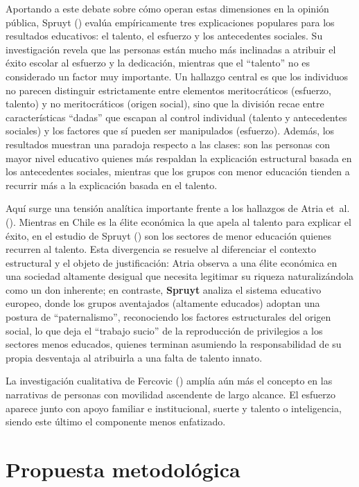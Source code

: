 \documentclass[
  spanish,
  a4paper,
  oneside]{scrbook}
\begin{document}
Aportando a este debate sobre cómo operan estas dimensiones en la
opinión pública, Spruyt ()
evalúa empíricamente tres explicaciones populares para los resultados
educativos: el talento, el esfuerzo y los antecedentes sociales. Su
investigación revela que las personas están mucho más inclinadas a
atribuir el éxito escolar al esfuerzo y la dedicación, mientras que el
``talento'' no es considerado un factor muy importante. Un hallazgo
central es que los individuos no parecen distinguir estrictamente entre
elementos meritocráticos (esfuerzo, talento) y no meritocráticos (origen
social), sino que la división recae entre características ``dadas'' que
escapan al control individual (talento y antecedentes sociales) y los
factores que sí pueden ser manipulados (esfuerzo). Además, los
resultados muestran una paradoja respecto a las clases: son las personas
con mayor nivel educativo quienes más respaldan la explicación
estructural basada en los antecedentes sociales, mientras que los grupos
con menor educación tienden a recurrir más a la explicación basada en el
talento.

Aquí surge una tensión analítica importante frente a los hallazgos de
Atria et~al. (). Mientras en
Chile es la élite económica la que apela al talento para explicar el
éxito, en el estudio de Spruyt
() son los sectores de menor
educación quienes recurren al talento. Esta divergencia se resuelve al
diferenciar el contexto estructural y el objeto de justificación: Atria
observa a una élite económica en una sociedad altamente desigual que
necesita legitimar su riqueza naturalizándola como un don inherente; en
contraste, \textbf{Spruyt} analiza el sistema educativo europeo, donde
los grupos aventajados (altamente educados) adoptan una postura de
``paternalismo'', reconociendo los factores estructurales del origen
social, lo que deja el ``trabajo sucio'' de la reproducción de
privilegios a los sectores menos educados, quienes terminan asumiendo la
responsabilidad de su propia desventaja al atribuirla a una falta de
talento innato.

La investigación cualitativa de Fercovic
() amplía aún más el
concepto en las narrativas de personas con movilidad ascendente de largo
alcance. El esfuerzo aparece junto con apoyo familiar e institucional,
suerte y talento o inteligencia, siendo este último el componente menos
enfatizado.

\section{Propuesta metodológica}\label{propuesta-metodoluxf3gica}
\end{document}
